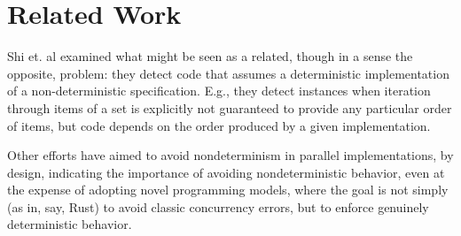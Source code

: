\section{Related Work}

Shi et. al \cite{DetermImp} examined what might be seen as a related, though in a sense the opposite, problem:  they detect code that assumes a deterministic implementation of a non-deterministic specification.  E.g., they detect instances when  iteration through items of a set is explicitly not guaranteed to provide any particular order of items, but code depends on the order produced by a given implementation.

Other efforts \cite{ParallelDeterministic} have aimed to avoid nondeterminism in parallel implementations, by design, indicating the importance of avoiding nondeterministic behavior, even at the expense of adopting novel programming models, where the goal is not simply (as in, say, Rust) to avoid classic concurrency errors, but to enforce genuinely deterministic behavior.
